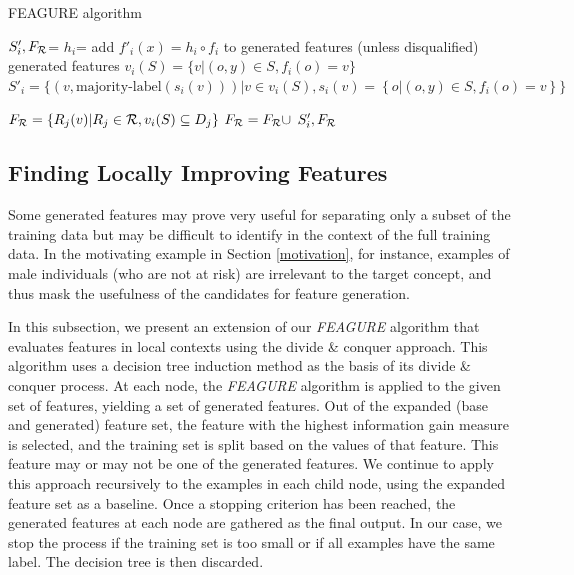 \documentclass[twoside,11pt]{article}
\theoremstyle{definition}
\begin{document}
\begin{algorithm}[H]
	\caption{FEAGURE algorithm}
	\label{code-creating-prob}
	\small
	\begin{algorithmic}
		\State $S'_i,F_{\cal R}$=  %
		\State $h_i$=  
		\State add $f'_i(x)=h_i\circ f_i$ to generated features (unless disqualified)
		\EndFor
		\State \Return generated features
		\EndFunction
		\State 
		\State $v_i(S) = \{v | (o,y) \in S, f_{i}(o)=v\}$
		\State		$S'_i =  \{ (v, \mbox{majority-label}(s_i(v))) | v \in v_i(S),		 s_i(v)=\left \{o | (o,y)\in S, f_{i}(o)=v \right \}  \} $
		
		
		\State $F_{\cal R}=\{R_j(v)| R_j\in{\cal R}, v_i(S)\subseteq D_j\}$
		\State $F_{\cal R}=F_{\cal R}\cup$
		\EndIf
		\State \Return $S'_i, F_{\cal R}$ 
		\EndFunction
		
	\end{algorithmic}
\end{algorithm}

\subsection{Finding Locally Improving Features} \label{tree_usage}

Some generated features may prove very useful for separating only a subset of the training data but may be difficult to identify in the context of the full training data. In the motivating example in Section \ref{motivation}, for instance, examples of male individuals (who are not at risk) are irrelevant to the target concept, and thus mask the usefulness of the candidates for feature generation.

In this subsection, we present an extension of our \emph{FEAGURE} algorithm that evaluates features in local contexts using the divide \& conquer approach.
This algorithm uses a decision tree induction method as the basis of its divide \& conquer process. At each node, the \emph{FEAGURE} algorithm is applied to the given set of features, yielding a set of generated features. Out of the expanded (base and generated) feature set, the feature with the highest information gain measure \cite{quinlan1986} is selected, and the training set is split based on the values of that feature. This feature may or may not be one of the generated features. We continue to apply this approach recursively to the examples in each child node, using the expanded feature set as a baseline.
Once a stopping criterion has been reached, the generated features at each node are gathered as the final output. In our case, we stop the process if the training set is too small or if all examples have the same label. The decision tree is then discarded.
\end{document}
